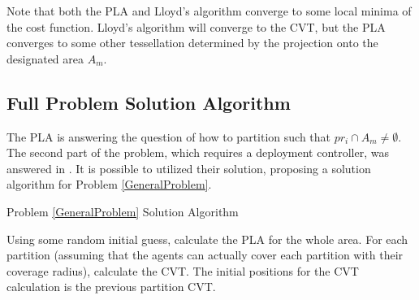 \documentclass{iacas}
\begin{document}
Note that both the PLA and Lloyd's algorithm converge to some local minima of the cost function.  Lloyd's algorithm will converge to the CVT, but the PLA converges to some other tessellation determined by the projection onto the designated area $A_m$.


\subsection{Full Problem Solution Algorithm}
The PLA is answering the question of how to partition such that $pr_i \cap A_m \neq \emptyset$. The second part of the problem, which requires a deployment controller, was answered in \cite{Cortes2004}. It is possible to utilized their solution, proposing a solution algorithm for Problem \ref{GeneralProblem}.

\begin{algorithm}[H]
\caption{Problem \ref{GeneralProblem} Solution Algorithm}\label{GeneralProbSolution}
\begin{algorithmic}[1]
\State Using some random initial guess, calculate the PLA for the whole area.
\State For each partition (assuming that the agents can actually cover each partition with their coverage radius), calculate the CVT. The initial positions for the CVT calculation is the previous partition CVT.
\end{algorithmic}
\label{algo:problem solution algorithm}
\end{algorithm}
\end{document}
